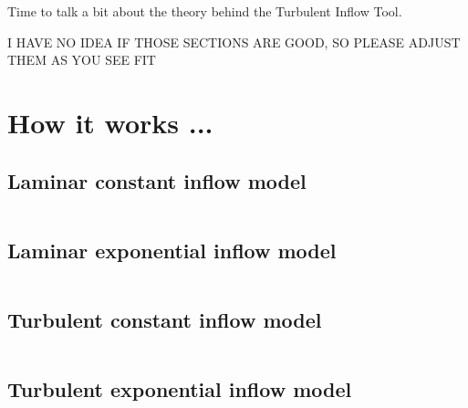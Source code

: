 
Time to talk a bit about the theory behind the Turbulent Inflow Tool.

I HAVE NO IDEA IF THOSE SECTIONS ARE GOOD, SO PLEASE ADJUST THEM AS YOU SEE FIT

\section{How it works ...}
\label{sec:theoryAll}

\subsection{Laminar constant inflow model}
\label{sec:}

\begin{equation}
   \label{eq:1}
\end{equation}
\begin{equation}
   \label{eq:2}
\end{equation}
\begin{equation}
   \label{eq:3}
\end{equation}

\subsection{Laminar exponential inflow model}
\label{sec:}

\begin{equation}
   \label{eq:4}
\end{equation}
\begin{equation}
   \label{eq:5}
\end{equation}
\begin{equation}
   \label{eq:6}
\end{equation}

\subsection{Turbulent constant inflow model}
\label{sec:}

\begin{equation}
   \label{eq:7}
\end{equation}
\begin{equation}
   \label{eq:8}
\end{equation}
\begin{equation}
   \label{eq:9}
\end{equation}

\subsection{Turbulent exponential inflow model}
\label{sec:}

\begin{equation}
   \label{eq:10}
\end{equation}
\begin{equation}
   \label{eq:11}
\end{equation}
\begin{equation}
   \label{eq:12}
\end{equation}
